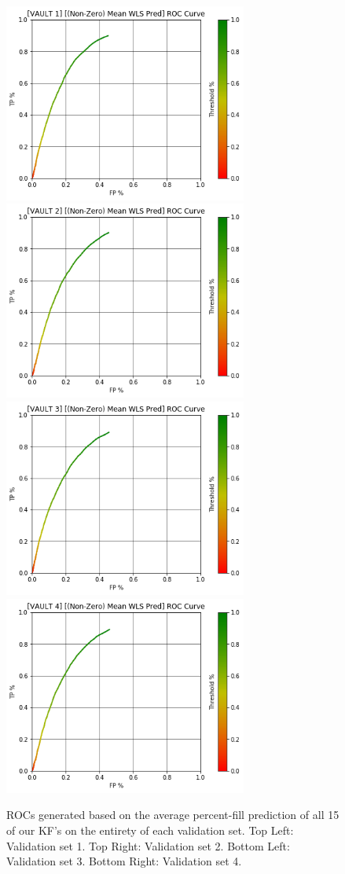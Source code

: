 \begin{figure}[h]
\centering
\includegraphics[width=8cm]{body/results/Graphs/JustSeries/1.PerformaceofMean/2.WLS/Non-Zero/v1.png}
\includegraphics[width=8cm]{body/results/Graphs/JustSeries/1.PerformaceofMean/2.WLS/Non-Zero/v2.png}
\includegraphics[width=8cm]{body/results/Graphs/JustSeries/1.PerformaceofMean/2.WLS/Non-Zero/v3.png}
\includegraphics[width=8cm]{body/results/Graphs/JustSeries/1.PerformaceofMean/2.WLS/Non-Zero/v4.png}
\caption{ROCs generated based on the average percent-fill prediction of all 15 of our KF's on the entirety of each validation set. Top Left: Validation set 1. Top Right: Validation set 2. Bottom Left: Validation set 3. Bottom Right: Validation set 4.}
\label{fig:averageWLSn0}
\end{figure}

